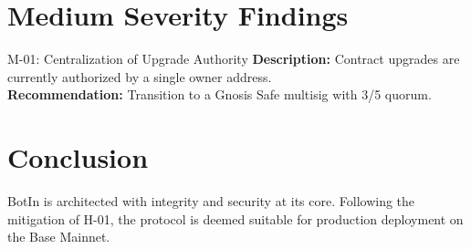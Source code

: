\documentclass[11pt,a4paper]{article}
\begin{document}
\section{Medium Severity Findings}
\begin{premiumbox}{M-01: Centralization of Upgrade Authority}
    \textbf{Description:} Contract upgrades are currently authorized by a single owner address. \\
    \textbf{Recommendation:} Transition to a Gnosis Safe multisig with 3/5 quorum.
\end{premiumbox}

\section{Conclusion}
BotIn is architected with integrity and security at its core. Following the mitigation of H-01, the protocol is deemed suitable for production deployment on the Base Mainnet.
\end{document}
